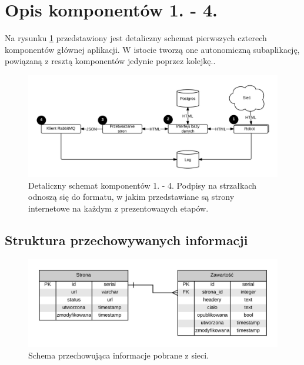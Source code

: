 \section{Opis komponentów 1. - 4.}

Na rysunku \ref{graph:mri} przedstawiony jest detaliczny schemat pierwszych czterech komponentów głównej aplikacji. W istocie tworzą one autonomiczną subaplikację, powiązaną z resztą
komponentów jedynie poprzez kolejkę.. 

\begin{figure}[!h]
    \centering
    \label{graph:mri}
    \includegraphics[scale=0.22]{mri}
    \caption{Detaliczny schemat komponentów 1. - 4. Podpisy na strzałkach odnoszą się do formatu, w jakim przedstawiane są strony internetowe na każdym z prezentowanych etapów. }
\end{figure}

\subsection{Struktura przechowywanych informacji}
\label{subs:struktMri}

\begin{figure}[!h]
    \centering
    \label{graph:mri_schema}
    \includegraphics[width=\textwidth]{mri_schema}
    \caption{Schema przechowująca informacje pobrane z sieci.}
\end{figure}

